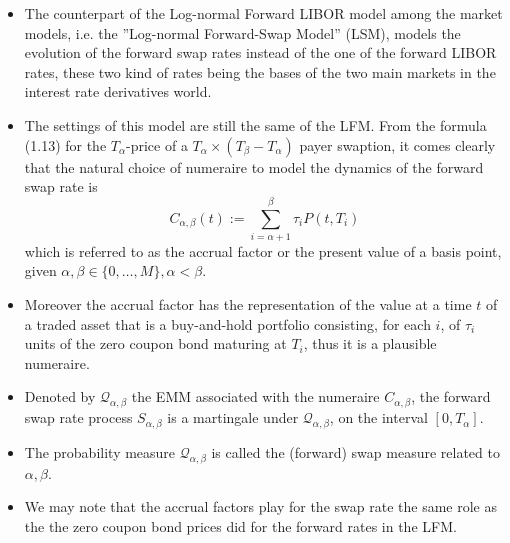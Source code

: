 \documentclass{beamer}
\begin{document}
\begin{frame}
\begin{itemize}
\item The counterpart of the Log-normal Forward LIBOR model among the market models, i.e. the ”Log-normal Forward-Swap Model” (LSM), models the evolution of the forward swap rates instead of the one of the forward LIBOR rates, these two kind of rates being the bases of the two main markets in the interest rate derivatives world. 
\item The settings of this model are still the same of the LFM.
From the formula (1.13) for the $T_\alpha$-price of a $T_\alpha\times(T_\beta-T_\alpha)$ payer swaption, it comes clearly that the natural choice of numeraire to model the dynamics
of the forward swap rate is
\begin{equation}
C_{\alpha,\beta}(t) := \sum^\beta_{i=\alpha+1}\tau_i P(t, T_i)
\end{equation}
which is referred to as the accrual factor or the present value of a basis point, given $\alpha, \beta \in \{0,\ldots, M\}, \alpha < \beta$. 
\end{itemize}
\end{frame}

\begin{frame}
	\begin{itemize}
	\item Moreover the accrual factor has the representation of the value at a time $t$ of a traded asset that is a buy-and-hold portfolio consisting, for each $i$, of $\tau_i$ units of the zero coupon bond maturing at $T_i$, thus it is a plausible numeraire.
	\item Denoted by $\mathcal{Q}_{\alpha,\beta}$ the EMM associated with the numeraire $C_{\alpha,\beta}$, the forward swap rate process $S_{\alpha,\beta}$ is a martingale under $\mathcal{Q}_{\alpha,\beta}$, on the interval $[0, T_\alpha]$.
	\item The probability measure $\mathcal{Q}_{\alpha,\beta}$ is called the (forward) swap measure related to $\alpha, \beta$.
	\item We may note that the accrual factors play for the swap rate the same role as the the zero coupon bond prices did for the forward rates in the LFM. 
\end{itemize}
\end{frame}
\end{document}
